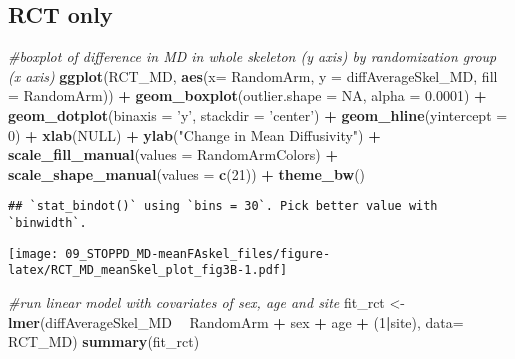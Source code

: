 \documentclass[]{article}
\newenvironment{Shaded}{\begin{snugshade}}{\end{snugshade}}
\newcommand{\KeywordTok}[1]{\textcolor[rgb]{0.13,0.29,0.53}{\textbf{#1}}}
\newcommand{\DataTypeTok}[1]{\textcolor[rgb]{0.13,0.29,0.53}{#1}}
\newcommand{\DecValTok}[1]{\textcolor[rgb]{0.00,0.00,0.81}{#1}}
\newcommand{\FloatTok}[1]{\textcolor[rgb]{0.00,0.00,0.81}{#1}}
\newcommand{\StringTok}[1]{\textcolor[rgb]{0.31,0.60,0.02}{#1}}
\newcommand{\CommentTok}[1]{\textcolor[rgb]{0.56,0.35,0.01}{\textit{#1}}}
\newcommand{\OtherTok}[1]{\textcolor[rgb]{0.56,0.35,0.01}{#1}}
\newcommand{\OperatorTok}[1]{\textcolor[rgb]{0.81,0.36,0.00}{\textbf{#1}}}
\newcommand{\NormalTok}[1]{#1}
\theoremstyle{definition}
\theoremstyle{definition}
\theoremstyle{definition}
\theoremstyle{remark}
\begin{document}
\subsection{RCT only}\label{rct-only-3}

\begin{Shaded}
\begin{Highlighting}[]
\CommentTok{#boxplot of difference in MD in whole skeleton (y axis) by randomization group (x axis)}
\KeywordTok{ggplot}\NormalTok{(RCT_MD, }\KeywordTok{aes}\NormalTok{(}\DataTypeTok{x=}\NormalTok{ RandomArm, }\DataTypeTok{y =}\NormalTok{ diffAverageSkel_MD, }\DataTypeTok{fill =}\NormalTok{ RandomArm)) }\OperatorTok{+}\StringTok{ }
\StringTok{   }\KeywordTok{geom_boxplot}\NormalTok{(}\DataTypeTok{outlier.shape =} \OtherTok{NA}\NormalTok{, }\DataTypeTok{alpha =} \FloatTok{0.0001}\NormalTok{) }\OperatorTok{+}\StringTok{ }
\StringTok{   }\KeywordTok{geom_dotplot}\NormalTok{(}\DataTypeTok{binaxis =} \StringTok{'y'}\NormalTok{, }\DataTypeTok{stackdir =} \StringTok{'center'}\NormalTok{) }\OperatorTok{+}
\StringTok{   }\KeywordTok{geom_hline}\NormalTok{(}\DataTypeTok{yintercept =} \DecValTok{0}\NormalTok{) }\OperatorTok{+}
\StringTok{   }\KeywordTok{xlab}\NormalTok{(}\OtherTok{NULL}\NormalTok{) }\OperatorTok{+}\StringTok{  }
\StringTok{   }\KeywordTok{ylab}\NormalTok{(}\StringTok{"Change in Mean Diffusivity"}\NormalTok{) }\OperatorTok{+}
\StringTok{   }\KeywordTok{scale_fill_manual}\NormalTok{(}\DataTypeTok{values =}\NormalTok{ RandomArmColors) }\OperatorTok{+}
\StringTok{   }\KeywordTok{scale_shape_manual}\NormalTok{(}\DataTypeTok{values =} \KeywordTok{c}\NormalTok{(}\DecValTok{21}\NormalTok{)) }\OperatorTok{+}
\StringTok{   }\KeywordTok{theme_bw}\NormalTok{()}
\end{Highlighting}
\end{Shaded}

\begin{verbatim}
## `stat_bindot()` using `bins = 30`. Pick better value with `binwidth`.
\end{verbatim}

\texttt{[image: 09\_STOPPD\_MD-meanFAskel\_files/figure-latex/RCT\_MD\_meanSkel\_plot\_fig3B-1.pdf]}

\begin{Shaded}
\begin{Highlighting}[]
\CommentTok{#run linear model with covariates of sex, age and site}
\NormalTok{fit_rct <-}\StringTok{ }\KeywordTok{lmer}\NormalTok{(diffAverageSkel_MD }\OperatorTok{~}\StringTok{ }\NormalTok{RandomArm }\OperatorTok{+}\StringTok{ }\NormalTok{sex }\OperatorTok{+}\StringTok{ }\NormalTok{age }\OperatorTok{+}\StringTok{ }\NormalTok{(}\DecValTok{1}\OperatorTok{|}\NormalTok{site), }\DataTypeTok{data=}\NormalTok{ RCT_MD)}
\KeywordTok{summary}\NormalTok{(fit_rct)}
\end{Highlighting}
\end{Shaded}
\end{document}
